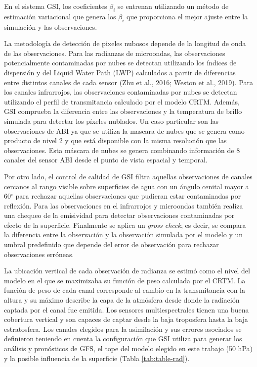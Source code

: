 \documentclass[12pt,oneside,a4paper]{reedthesis}
\begin{document}
En el sistema GSI, los coeficientes \(\beta_i\) se entrenan utilizando un método de estimación variacional que genera los \(\beta_i\) que proporciona el mejor ajuste entre la simulación y las observaciones.

La metodología de detección de pixeles nubosos depende de la longitud de onda de las observaciones. Para las radianzas de microondas, las observaciones potencialmente contaminadas por nubes se detectan utilizando los índices de dispersión y del Liquid Water Path (LWP) calculados a partir de diferencias entre distintos canales de cada sensor (Zhu et al., 2016; Weston et al., 2019). Para los canales infrarrojos, las observaciones contaminadas por nubes se detectan utilizando el perfil de transmitancia calculado por el modelo CRTM. Además, GSI comprueba la diferencia entre las observaciones y la temperatura de brillo simulada para detectar los píxeles nublados. Un caso particular son las observaciones de ABI ya que se utiliza la mascara de nubes que se genera como producto de nivel 2 y que está disponible con la misma resolución que las observaciones. Esta máscara de nubes se genera combinando información de 8 canales del sensor ABI desde el punto de vista espacial y temporal.

Por otro lado, el control de calidad de GSI filtra aquellas observaciones de canales cercanos al rango visible sobre superficies de agua con un ángulo cenital mayor a 60\(^{\circ}\) para rechazar aquellas observaciones que pudieran estar contaminadas por reflexión. Para las observaciones en el infrarrojos y microondas también realiza una chequeo de la emisividad para detectar observaciones contaminadas por efecto de la superficie. Finalmente se aplica un \emph{gross check}, es decir, se compara la diferencia entre la observación y la observación simulada por el modelo y un umbral predefinido que depende del error de observación para rechazar observaciones erróneas.

La ubicación vertical de cada observación de radianza se estimó como el nivel del modelo en el que se maximizaba su función de peso calculada por el CRTM. La función de peso de cada canal corresponde al cambio en la transmitancia con la altura y su máximo describe la capa de la atmósfera desde donde la radiación captada por el canal fue emitida. Los sensores multiespectrales tienen una buena cobertura vertical y son capaces de captar desde la baja troposfera hasta la baja estratosfera. Los canales elegidos para la asimilación y sus errores asociados se definieron teniendo en cuenta la configuración que GSI utiliza para generar los análisis y pronósticos de GFS, el tope del modelo elegido en este trabajo (50 hPa) y la posible influencia de la superficie (Tabla \ref{tab:table-rad}).
\end{document}
